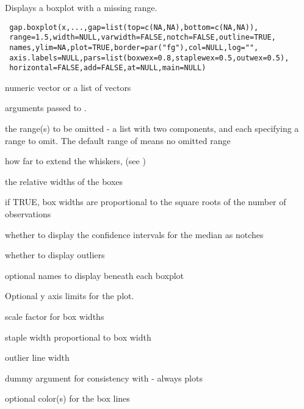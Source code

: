 \begin{Description}\relax
Displays a boxplot with a missing range.
\end{Description}
\begin{Usage}
\begin{verbatim}
 gap.boxplot(x,...,gap=list(top=c(NA,NA),bottom=c(NA,NA)),
 range=1.5,width=NULL,varwidth=FALSE,notch=FALSE,outline=TRUE,
 names,ylim=NA,plot=TRUE,border=par("fg"),col=NULL,log="",
 axis.labels=NULL,pars=list(boxwex=0.8,staplewex=0.5,outwex=0.5),
 horizontal=FALSE,add=FALSE,at=NULL,main=NULL)
\end{verbatim}
\end{Usage}
\begin{Arguments}
\begin{ldescription}
\item[\code{x}] numeric vector or a list of vectors
\item[\code{...}] arguments passed to .
\item[\code{gap}] the range(s) to be omitted - a list with two components,
 and  each specifying a range to omit. The
default range of  means no omitted range
\item[\code{range}] how far to extend the whiskers, (see )
\item[\code{width}] the relative widths of the boxes
\item[\code{varwidth}] if TRUE, box widths are proportional to the square roots
of the number of observations
\item[\code{notch}] whether to display the confidence intervals for the
median as notches
\item[\code{outline}] whether to display outliers
\item[\code{names}] optional names to display beneath each boxplot
\item[\code{ylim}] Optional y axis limits for the plot.
\item[\code{boxwex}] scale factor for box widths
\item[\code{staplewex}] staple width proportional to box width
\item[\code{outwex}] outlier line width
\item[\code{plot}] dummy argument for consistency with  - always
plots
\item[\code{border}] optional color(s) for the box lines

\end{ldescription}
\end{Arguments}
